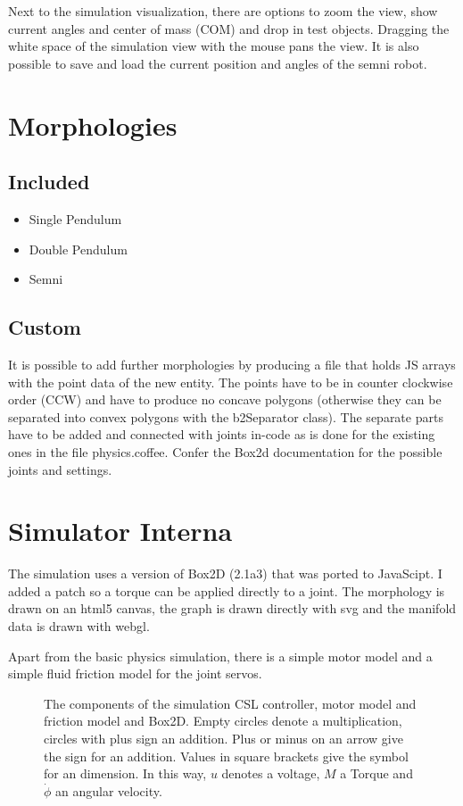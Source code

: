 \documentclass[10pt,a4paper]{article}
\begin{document}
Next to the simulation visualization, there are options to zoom the view, show current angles and
center of mass (COM) and drop in test objects. Dragging the white space of the simulation view with
the mouse pans the view. It is also possible to save and load the current position and angles of the
semni robot.

\section{Morphologies}
\subsection{Included}
\begin{itemize}
\item Single Pendulum
\item Double Pendulum
\item Semni
\end{itemize}

\subsection{Custom}

It is possible to add further morphologies by producing a file that holds JS arrays with the point
data of the new entity. The points have to be in counter clockwise order (CCW) and have to produce no
concave polygons (otherwise they can be separated into convex polygons with the b2Separator class).
The separate parts have to be added and connected with joints in-code as is done for the existing ones
in the file physics.coffee. Confer the Box2d documentation for the possible joints and settings.

\section{Simulator Interna}
\label{sim_internal}

The simulation uses a version of Box2D (2.1a3) that was ported to JavaScipt. I added a patch
so a torque can be applied directly to a joint.
The morphology is drawn on an html5 canvas, the graph is drawn directly with svg and the manifold
data is drawn with webgl.

Apart from the basic physics simulation, there is a simple motor model and a simple fluid friction
model for the joint servos.

\begin{figure}[H]
    \centering
    
    \caption{The components of the simulation CSL controller, motor model and
    friction model and Box2D. Empty circles denote a multiplication, circles with plus sign
    an addition. Plus or minus on an arrow give the sign for an addition.
    Values in square brackets give the symbol for an dimension. In this way, $u$ denotes
    a voltage, $M$ a Torque and $\dot{\phi}$ an angular velocity.}
    \label{fig:controllermodel}
\end{figure}
\end{document}
